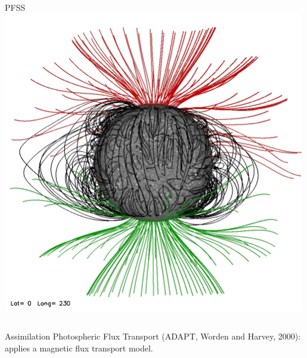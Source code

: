 \documentclass{beamer}
\begin{document}
{{\begin{columns}
\centering PFSS
\includegraphics[width=0.99\textwidth]{figuras/CR2081.jpg}
\end{columns}
\bu \small{Assimilation Photospheric Flux Transport (ADAPT, Worden and Harvey, 2000): applies a magnetic flux transport model.}
}
}
\end{document}
